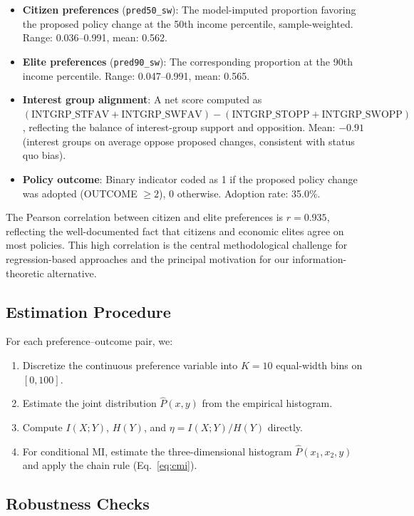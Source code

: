 \documentclass[twocolumn,10pt]{article}
\begin{document}
\begin{itemize}
\item \textbf{Citizen preferences} (\texttt{pred50\_sw}): The model-imputed proportion favoring the proposed policy change at the 50th income percentile, sample-weighted.  Range: 0.036--0.991, mean: 0.562.
\item \textbf{Elite preferences} (\texttt{pred90\_sw}): The corresponding proportion at the 90th income percentile.  Range: 0.047--0.991, mean: 0.565.
\item \textbf{Interest group alignment}: A net score computed as $(\text{INTGRP\_STFAV} + \text{INTGRP\_SWFAV}) - (\text{INTGRP\_STOPP} + \text{INTGRP\_SWOPP})$, reflecting the balance of interest-group support and opposition.  Mean: $-0.91$ (interest groups on average oppose proposed changes, consistent with status quo bias).
\item \textbf{Policy outcome}: Binary indicator coded as 1 if the proposed policy change was adopted (OUTCOME $\geq 2$), 0 otherwise.  Adoption rate: 35.0\%.
\end{itemize}

The Pearson correlation between citizen and elite preferences is $r = 0.935$, reflecting the well-documented fact that citizens and economic elites agree on most policies.  This high correlation is the central methodological challenge for regression-based approaches and the principal motivation for our information-theoretic alternative.

\subsection{Estimation Procedure}

For each preference--outcome pair, we:
\begin{enumerate}
\item Discretize the continuous preference variable into $K = 10$ equal-width bins on $[0, 100]$.
\item Estimate the joint distribution $\hat{P}(x, y)$ from the empirical histogram.
\item Compute $I(X;Y)$, $H(Y)$, and $\eta = I(X;Y)/H(Y)$ directly.
\item For conditional MI, estimate the three-dimensional histogram $\hat{P}(x_1, x_2, y)$ and apply the chain rule (Eq.~\ref{eq:cmi}).
\end{enumerate}

\subsection{Robustness Checks}
\end{document}

